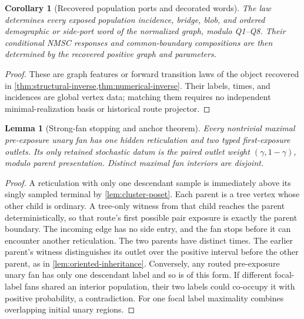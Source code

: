 \documentclass[11pt]{article}
\newtheorem{lemma}[theorem]{Lemma}
\newtheorem{corollary}[theorem]{Corollary}
\begin{document}
\begin{corollary}[Recovered population ports and decorated words]
\label{thm:bridge}
\label{lem:canonical-port-gluing}
The law determines every exposed population incidence, bridge, blob, and
ordered demographic or side-port word of the normalized graph, modulo
Q1--Q8.  Their conditional NMSC responses and common-boundary compositions
are then determined by the recovered positive graph and parameters.
\end{corollary}
\begin{proof}
These are graph features or forward transition laws of the object recovered
in \cref{thm:structural-inverse,thm:numerical-inverse}.  Their labels,
times, and incidences are global vertex data; matching them requires no
independent minimal-realization basis or historical route projector.
\end{proof}

\begin{lemma}[Strong-fan stopping and anchor theorem]
\label{lem:strong-fan}
Every nontrivial maximal pre-exposure unary fan has one hidden reticulation
and two typed first-exposure outlets.  Its only retained stochastic datum
is the paired outlet weight $(\gamma,1-\gamma)$, modulo parent presentation.
Distinct maximal fan interiors are disjoint.
\end{lemma}
\begin{proof}
A reticulation with only one descendant sample is immediately above its
singly sampled terminal by \cref{lem:cluster-poset}.  Each parent is a
tree vertex whose other child is ordinary.  A tree-only witness from that
child reaches the parent deterministically, so that route's first possible
pair exposure is exactly the parent boundary.  The incoming edge has no
side entry, and the fan stops before it can encounter another reticulation.
The two parents have distinct times.  The earlier parent's witness
distinguishes its outlet over the positive interval before the other
parent, as in \cref{lem:oriented-inheritance}.  Conversely, any routed
pre-exposure unary fan has only one descendant label and so is of this
form.  If different focal-label fans shared an interior population, their
two labels could co-occupy it with positive probability, a contradiction.
For one focal label maximality combines overlapping initial unary regions.
\end{proof}
\end{document}
